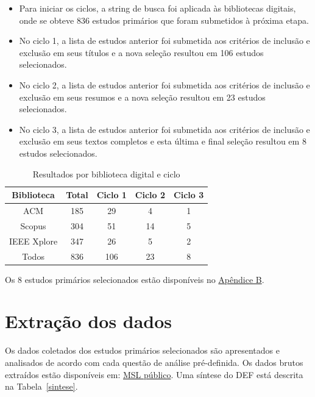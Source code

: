 \documentclass[
	12pt,
	openright,
	twoside,
	a4paper,
	english,
	brazil
	]{abntex2}
\begin{document}
\begin{itemize}
  \item Para iniciar os ciclos, a string de busca foi aplicada às bibliotecas digitais, onde se obteve 836 estudos primários que foram submetidos à próxima etapa.
  \item No ciclo 1, a lista de estudos anterior foi submetida aos critérios de inclusão e exclusão em seus títulos e a nova seleção resultou em 106 estudos selecionados.
  \item No ciclo 2, a lista de estudos anterior foi submetida aos critérios de inclusão e exclusão em seus resumos e a nova seleção resultou em 23 estudos selecionados.
  \item No ciclo 3, a lista de estudos anterior foi submetida aos critérios de inclusão e exclusão em seus textos completos e esta última e final seleção resultou em 8 estudos selecionados.
\end{itemize}

\begin{table}[h!]
  \centering
  \caption{Resultados por biblioteca digital e ciclo}
  \begin{tabular}{|c|c|c|c|c|}
  \hline
  \textbf{Biblioteca} & \textbf{Total} & \textbf{Ciclo 1} & \textbf{Ciclo 2} & \textbf{Ciclo 3} \\ \hline
  ACM & 185 & 29 & 4 & 1 \\ \hline
  Scopus & 304 & 51 & 14 & 5 \\ \hline
  IEEE Xplore & 347 & 26 & 5 & 2 \\ \hline
  Todos & 836 & 106 & 23 & 8 \\ \hline
  \end{tabular}
\end{table}

Os 8 estudos primários selecionados estão disponíveis no \hyperref[apendiceB]{Apêndice B}.


\section{Extração dos dados}

Os dados coletados dos estudos primários selecionados são apresentados e analisados de acordo com cada questão de análise pré-definida. Os dados brutos extraídos estão disponíveis em: \href{https://docs.google.com/spreadsheets/d/1YY_yjyBefJ3ZmnEY38TM_LnZLoJcKhrw_q0BdEvqx2E/edit?gid=1276800509#gid=1276800509}{MSL público}. Uma síntese do DEF está descrita na Tabela~\ref{sintese}.
\end{document}
